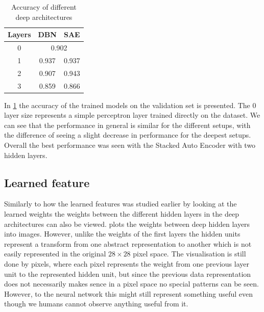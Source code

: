 \documentclass{article}
\begin{document}
\begin{table}[!ht]
  \centering
  \caption{Accuracy of different deep architectures}
  \label{tab:accuracy}
  \begin{tabular}{ccc}
    Layers & DBN & SAE \\ \midrule
    0 & \multicolumn{2}{c}{0.902} \\
    1 & 0.937 & 0.937 \\
    2 & 0.907 & 0.943 \\
    3 & 0.859 & 0.866
  \end{tabular}
\end{table}

In \cref{tab:accuracy} the accuracy of the trained models on the validation set is presented.
The 0 layer size represents a simple perceptron layer trained directly on the dataset.
We can see that the performance in general is similar for the different setups,
with the difference of seeing a slight decrease in performance for the deepest setups.
Overall the best performance was seen with the Stacked Auto Encoder with two hidden layers.

\subsection{Learned feature}
Similarly to how the learned features was studied earlier by looking at the learned weights
the weights between the different hidden layers in the deep architectures can also be viewed.
 plots the weights between deep hidden layers into images.
However, unlike the weights of the first layers the hidden units represent a transform
from one abstract representation to another
which is not easily represented in the original $28 \times 28$ pixel space.
The visualisation is still done by pixels,
where each pixel represents the weight from one previous layer unit to the represented hidden unit,
but since the previous data representation does not necessarily makes sence in a pixel space
no special patterns can be seen.
However, to the neural network this might still represent something useful
even though we humans cannot observe anything useful from it.
\end{document}
